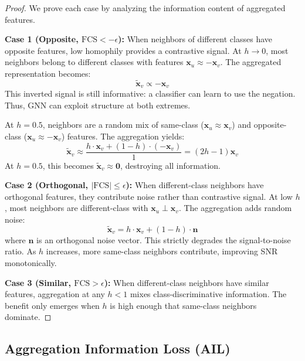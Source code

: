 \begin{proof}
We prove each case by analyzing the information content of aggregated features.

\textbf{Case 1 (Opposite, $\text{FCS} < -\epsilon$):}
When neighbors of different classes have opposite features, low homophily provides a contrastive signal. At $h \to 0$, most neighbors belong to different classes with features $\mathbf{x}_u \approx -\mathbf{x}_v$. The aggregated representation becomes:
\begin{equation}
    \tilde{\mathbf{x}}_v \propto -\mathbf{x}_v
\end{equation}
This inverted signal is still informative: a classifier can learn to use the negation. Thus, GNN can exploit structure at both extremes.

At $h = 0.5$, neighbors are a random mix of same-class ($\mathbf{x}_u \approx \mathbf{x}_v$) and opposite-class ($\mathbf{x}_u \approx -\mathbf{x}_v$) features. The aggregation yields:
\begin{equation}
    \tilde{\mathbf{x}}_v \approx \frac{h \cdot \mathbf{x}_v + (1-h) \cdot (-\mathbf{x}_v)}{1} = (2h-1)\mathbf{x}_v
\end{equation}
At $h = 0.5$, this becomes $\tilde{\mathbf{x}}_v \approx \mathbf{0}$, destroying all information.

\textbf{Case 2 (Orthogonal, $|\text{FCS}| \leq \epsilon$):}
When different-class neighbors have orthogonal features, they contribute noise rather than contrastive signal. At low $h$, most neighbors are different-class with $\mathbf{x}_u \perp \mathbf{x}_v$. The aggregation adds random noise:
\begin{equation}
    \tilde{\mathbf{x}}_v = h \cdot \mathbf{x}_v + (1-h) \cdot \mathbf{n}
\end{equation}
where $\mathbf{n}$ is an orthogonal noise vector. This strictly degrades the signal-to-noise ratio. As $h$ increases, more same-class neighbors contribute, improving SNR monotonically.

\textbf{Case 3 (Similar, $\text{FCS} > \epsilon$):}
When different-class neighbors have similar features, aggregation at any $h < 1$ mixes class-discriminative information. The benefit only emerges when $h$ is high enough that same-class neighbors dominate.
\end{proof}

\subsection{Aggregation Information Loss (AIL)}

